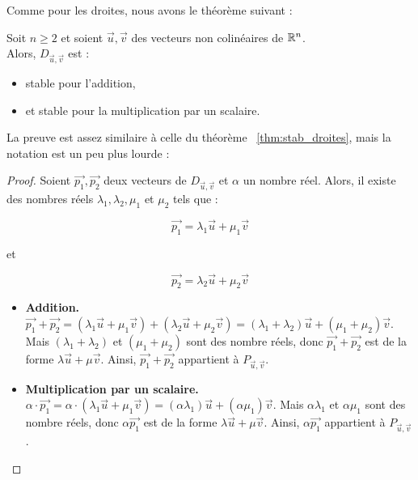 \begin{center}
\end{center}

Comme pour les droites, nous avons le théorème suivant :

\begin{boxthm}
Soit $n \geq 2$ et soient $\vec{u}, \vec{v}$ des vecteurs non colinéaires de $\mathbb{R}^n$.\\
Alors, $D_{\vec{u},\vec{v}}$ est :
\begin{itemize}
    \item stable pour l'addition,
    \item et stable pour la multiplication par un scalaire.
\end{itemize}
\end{boxthm}

La preuve est assez similaire à celle du théorème ~\ref{thm:stab_droites}, mais la notation est un peu plus lourde :
    
\begin{proof}
    Soient $\vec{p_1}, \vec{p_2}$ deux vecteurs de $D_{\vec{u},\vec{v}}$ et $\alpha$ un nombre réel. Alors, il existe des nombres réels $\lambda_1, \lambda_2, \mu_1$ et $\mu_2$  tels que :
    
    \[
        \vec{p_1} = \lambda_1\vec{u} + \mu_1\vec{v}
    \]
    
    et
    
    \[
        \vec{p_2} = \lambda_2\vec{u} + \mu_2\vec{v}
    \]
    
    \begin{itemize}
        \item \textbf{Addition.} $\vec{p_1} + \vec{p_2} = (\lambda_1\vec{u}+\mu_1\vec{v}) + (\lambda_2\vec{u}+\mu_2\vec{v}) = (\lambda_1 + \lambda_2)\vec{u}+(\mu_1+\mu_2)\vec{v}$. Mais $(\lambda_1+\lambda_2)$ et $(\mu_1+\mu_2)$ sont des nombre réels, donc $\vec{p_1}+\vec{p_2}$ est de la forme $\lambda\vec{u}+\mu\vec{v}$. Ainsi, $\vec{p_1}+\vec{p_2}$ appartient à $P_{\vec{u},\vec{v}}$.
        \item \textbf{Multiplication par un scalaire.} $\alpha \cdot \vec{p_1} = \alpha \cdot (\lambda_1\vec{u}+\mu_1\vec{v}) = (\alpha\lambda_1)\vec{u}+(\alpha\mu_1)\vec{v}$. Mais $\alpha\lambda_1$ et $\alpha\mu_1$ sont des nombre réels, donc $\alpha\vec{p_1}$ est de la forme $\lambda\vec{u}+\mu\vec{v}$. Ainsi, $\alpha\vec{p_1}$ appartient à $P_{\vec{u},\vec{v}}$.
    \end{itemize}
\end{proof}

